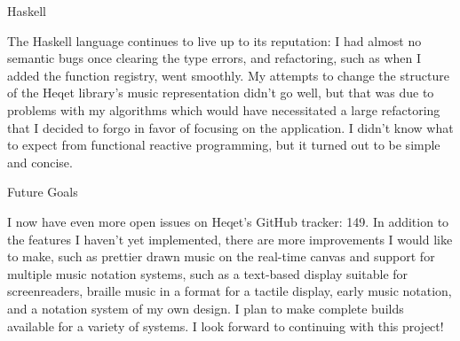 \documentclass{article}
\begin{document}
\begin{section}{Haskell}

The Haskell language continues to live up to its reputation: I had almost no semantic bugs once clearing the type errors, and refactoring, such as when I added the function registry, went smoothly. My  attempts to change the structure of the Heqet library's music representation didn't go well, but that was due to problems with my algorithms which would have necessitated a large refactoring that I decided to forgo in favor of focusing on the application. I didn't know what to expect from functional reactive programming, but it turned out to be simple and concise.
\end{section}

\begin{section}{Future Goals}

I now have even more open issues on Heqet's GitHub tracker: 149. In addition to the features I haven't yet implemented, there are more improvements I would like to make, such as prettier drawn music on the real-time canvas and support for multiple music notation systems, such as a text-based display suitable for screenreaders, braille music in a format for a tactile display, early music notation, and a notation system of my own design. I plan to make complete builds available for a variety of systems. I look forward to continuing with this project!

\end{section}
\end{document}

